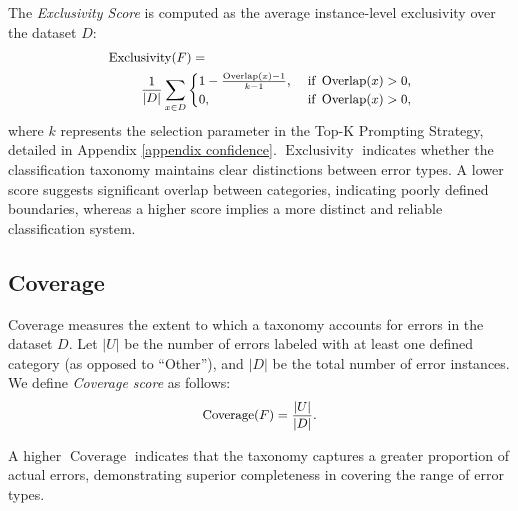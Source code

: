 The \textit{Exclusivity Score} is computed as the average instance-level exclusivity over the dataset $D$:
\begin{equation}\begin{small}\begin{aligned}
& \operatorname{Exclusivity}(F)= \\
& ~~~~~~~~\frac{1}{|D|}\sum_{x\in D}\begin{cases}
    1- \frac{\operatorname{Overlap}(x) - 1}{k - 1}, & \text{ if } \operatorname{Overlap}(x) > 0, \\
    0, & \text{ if } \operatorname{Overlap}(x) > 0,
\end{cases}
\end{aligned}\end{small}\end{equation}
\noindent where $k$ represents the selection parameter in the Top-K Prompting Strategy, detailed in Appendix \ref{appendix confidence}. $\operatorname{Exclusivity}$ indicates whether the classification taxonomy maintains clear distinctions between error types. A lower score suggests significant overlap between categories, indicating poorly defined boundaries, whereas a higher score implies a more distinct and reliable classification system.

\subsection{Coverage}
Coverage measures the extent to which a taxonomy accounts for errors in the dataset $D$. Let $|U|$ be the number of errors labeled with at least one defined category (as opposed to ``Other''), and $|D|$ be the total number of error instances. We define \textit{Coverage score} as follows:
\begin{equation}\begin{small}\begin{aligned}
\operatorname{Coverage}(F)=\frac{|U|}{|D|}.
\end{aligned}\end{small}\end{equation}

A higher $\operatorname{Coverage}$ indicates that the taxonomy captures a greater proportion of actual errors, demonstrating superior completeness in covering the range of error types.

